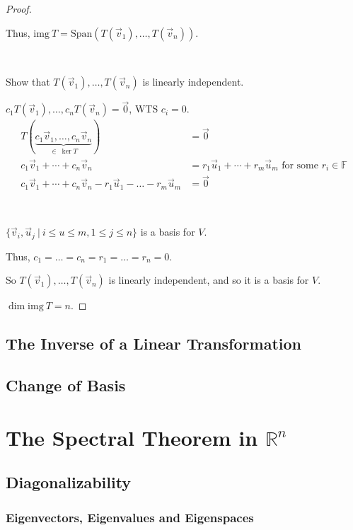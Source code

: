 \documentclass[11pt,fleqn]{book} %
\begin{document}
\begin{proof}
    {~~~}

    Thus, $\mathrm{img}~T = \mathrm{Span}\left( T(\vec{v}_1), \dots, T(\vec{v}_n) \right)$. 

    {~~~}

    Show that $T(\vec{v}_1), \dots, T(\vec{v}_n)$ is linearly independent. 
    
    $c_1 T(\vec{v}_1), \dots, c_nT(\vec{v}_n) = \vec{0}$, WTS $c_i = 0$. 
    \begin{align*}
        T ( \underbrace{c_1\vec{v}_1, \dots, c_n\vec{v}_n}_{\in~\ker T} ) 
        &= \vec{0}
        \\
        c_1\vec{v}_1 + \cdots + c_n\vec{v}_n 
        &= r_1\vec{u}_1 + \cdots + r_m\vec{u}_m \text{ for some } r_i \in \mathbb{F}
        \\
        c_1\vec{v}_1 + \cdots + c_n\vec{v}_n - r_1\vec{u}_1 - \dots - r_m\vec{u}_m 
        &= \vec{0}
    \end{align*}
    
    {~~~}

    $\{\vec{v}_i, \vec{u}_j ~|~  i \le u \le m, 1 \le j \le n \}$ is a basis for $V$. 
    
    Thus, $c_1 = \dots = c_n = r_1 = \dots = r_n = 0$. 
    
    So $T(\vec{v}_1), \dots, T(\vec{v}_n)$ is linearly independent, and so it is a basis for $V$. 
    
    $\dim \mathrm{img}~T = n$. 
\end{proof}

\section{The Inverse of a Linear Transformation}

\section{Change of Basis}

\chapter{The Spectral Theorem in $\mathbb{R}^n$}

\section{Diagonalizability}

\subsection{Eigenvectors, Eigenvalues and Eigenspaces}
\end{document}
